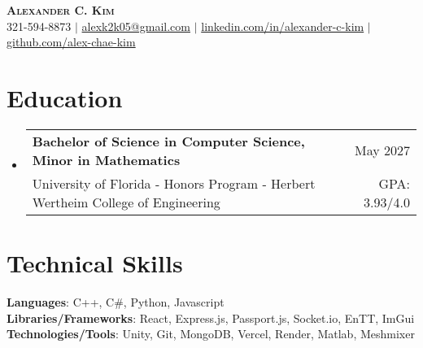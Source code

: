 \documentclass[letterpaper,11pt]{article}
\makeatletter
\newcommand{\resumeSubheading}[4]{
  \vspace{-2pt}\item
    \begin{tabular*}{\textwidth}[t]{l@{\extracolsep{\fill}}r}
      \small\textbf{#1} & #2 \\
      {\small#3} & {\small #4} \\
    \end{tabular*}\vspace{-7pt}
}
\newcommand{\resumeSubHeadingListStart}{\begin{itemize}[leftmargin=0in, label={}]}
\newcommand{\resumeSubHeadingListEnd}{\end{itemize}}
\makeatother
\begin{document}

\begin{center}
    \textbf{\Huge \scshape Alexander C. Kim} \\ \vspace{1pt}
    \small 321-594-8873 $|$ \href{mailto:x@x.com}{{alexk2k05@gmail.com}} $|$ 
    \href{https://linkedin.com/in/alexander-c-kim}{{linkedin.com/in/alexander-c-kim}} $|$
    \href{https://github.com/alex-chae-kim}{{github.com/alex-chae-kim}}
\end{center}


\section{\textbf{Education}}
  \resumeSubHeadingListStart
    \resumeSubheading
      {Bachelor of Science in Computer Science, Minor in Mathematics}{May 2027}
      {University of Florida - Honors Program - Herbert Wertheim College of Engineering}{GPA: 3.93/4.0}
  \resumeSubHeadingListEnd

\section{\textbf{Technical Skills}}
 \begin{itemize}[leftmargin=0in, label={}]
    \small{\item{
     \textbf{Languages}{: C++, C\#, Python, Javascript} \\
     \textbf{Libraries/Frameworks}{: React, Express.js, Passport.js, Socket.io, EnTT, ImGui} \\
     \textbf{Technologies/Tools}{: Unity, Git, MongoDB, Vercel, Render, Matlab, Meshmixer} \\

    }}
 \end{itemize}
\end{document}
